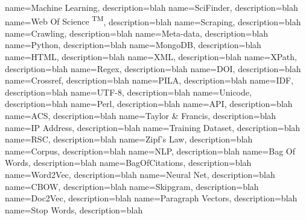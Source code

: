 {
name={Machine Learning},
description={blah} 
}
{
name={SciFinder\textsuperscript{\textregistered}},
description={blah} 
}
{
name={Web Of Science	\textsuperscript{TM}},
description={blah} 
}
{
name={Scraping},
description={blah} 
}
{
name={Crawling},
description={blah} 
}
{
name={Meta-data},
description={blah}
}
{
name={Python},
description={blah} 
}
{
name={MongoDB},
description={blah} 
}
{
name={HTML},
description={blah} 
}
{
name={XML},
description={blah} 
}
{
name={XPath},
description={blah} 
}
{
name={Regex},
description={blah} 
}
{
name={DOI},
description={blah} 
}
{
name={Crossref},
description={blah} 
}
{
name={PILA},
description={blah} 
}
{
name={IDF},
description={blah} 
}
{
name={UTF-8},
description={blah} 
}
{
name={Unicode},
description={blah} 
}
{
name={Perl},
description={blah} 
}
{
name={API},
description={blah} 
}
{
name={ACS},
description={blah} 
}
{
name={Taylor \& Francis},
description={blah} 
}
{
name={IP Address},
description={blah} 
}
{
name={Training Dataset},
description={blah} 
}
{
name={RSC},
description={blah} 
}
{
name={Zipf's Law},
description={blah} 
}
{
name={Corpus},
description={blah} 
}
{
name={NLP},
description={blah} 
}
{
name={Bag Of Words},
description={blah} 
}
{
name={BagOfCitations},
description={blah} 
}
{
name={Word2Vec},
description={blah} 
}
{
name={Neural Net},
description={blah} 
}
{
name={CBOW},
description={blah} 
}
{
name={Skipgram},
description={blah} 
}
{
name={Doc2Vec},
description={blah} 
}
{
name={Paragraph Vectors},
description={blah} 
}
{
name={Stop Words},
description={blah} 
}
